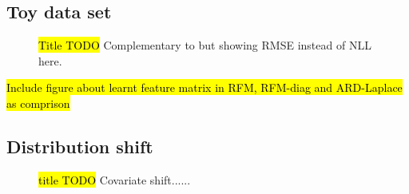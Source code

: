 \subsection{Toy data set}

\begin{figure}[htb]
    \centering
    
    \caption{
        \hl{Title TODO} Complementary to  but showing RMSE instead of NLL here.
        }
    \label{fig:toy-data-rmse}
\end{figure}

\hl{Include figure about learnt feature matrix in RFM, RFM-diag and ARD-Laplace as comprison}








\subsection{Distribution shift}


\begin{figure}[htb]
    \centering
    \begin{subfigure}[b]{0.475\textwidth}
        \centering
        
    \end{subfigure}
    \hfill
    \begin{subfigure}[b]{0.475\textwidth}  
        \centering
        
    \end{subfigure}
    \begin{subfigure}[b]{0.475\textwidth}   
        \centering
        
    \end{subfigure}     
    \hfill
    \begin{subfigure}[b]{0.475\textwidth}   
        \centering 
        
    \end{subfigure}
    \caption{
        \hl{title TODO} Covariate shift......
        } 
    \label{fig:ood-covariate-appendix}
\end{figure}


